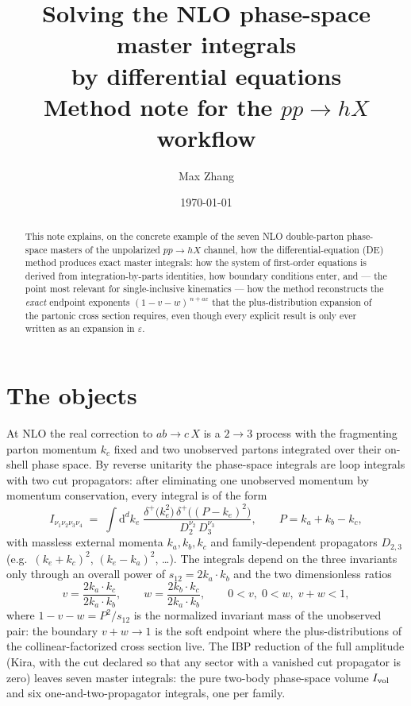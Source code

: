 \documentclass[11pt]{article}
\title{Solving the NLO phase-space master integrals\\
by differential equations\\[1ex]
\large Method note for the $pp \to h X$ workflow}
\author{Max Zhang}
\date{\today}
\newcommand{\eps}{\varepsilon}
\newcommand{\dd}{\mathrm{d}}
\begin{document}
\maketitle

\begin{abstract}
This note explains, on the concrete example of the seven NLO
double-parton phase-space masters of the unpolarized $pp \to hX$
channel, how the differential-equation (DE) method produces exact
master integrals: how the system of first-order equations is derived
from integration-by-parts identities, how boundary conditions enter,
and --- the point most relevant for single-inclusive kinematics ---
how the method reconstructs the \emph{exact} endpoint exponents
$(1-v-w)^{\,n+a\eps}$ that the plus-distribution expansion of the
partonic cross section requires, even though every explicit result is
only ever written as an expansion in $\eps$.
\end{abstract}

\section{The objects}
\label{sec:objects}

At NLO the real correction to $ab \to c\,X$ is a $2\to3$ process with
the fragmenting parton momentum $k_c$ fixed and two unobserved
partons integrated over their on-shell phase space.  By reverse
unitarity the phase-space integrals are loop integrals with two cut
propagators: after eliminating one unobserved momentum by momentum
conservation, every integral is of the form
\begin{equation}
  I_{\nu_1\nu_2\nu_3\nu_4}
  \;=\;
  \int \dd^d k_e\;
  \frac{\delta^{+}\!\big(k_e^2\big)\,
        \delta^{+}\!\big((P-k_e)^2\big)}
       {D_2^{\nu_2}\, D_3^{\nu_3}},
  \qquad P = k_a + k_b - k_c ,
  \label{eq:integral}
\end{equation}
with massless external momenta $k_a, k_b, k_c$ and family-dependent
propagators $D_{2,3}$ (e.g.\ $(k_e+k_c)^2$, $(k_e-k_a)^2$, \dots).
The integrals depend on the three invariants only through an overall
power of $s_{12} = 2k_a\!\cdot\!k_b$ and the two dimensionless ratios
\begin{equation}
  v = \frac{2k_a\!\cdot\!k_c}{2k_a\!\cdot\!k_b},
  \qquad
  w = \frac{2k_b\!\cdot\!k_c}{2k_a\!\cdot\!k_b},
  \qquad
  0 < v,\; 0 < w,\; v + w < 1 ,
\end{equation}
where $1 - v - w = P^2/s_{12}$ is the normalized invariant mass of
the unobserved pair: the boundary $v+w \to 1$ is the soft endpoint
where the plus-distributions of the collinear-factorized cross
section live.  The IBP reduction of the full amplitude (Kira, with
the cut declared so that any sector with a vanished cut propagator is
zero) leaves seven master integrals: the pure two-body phase-space
volume $I_{\rm vol}$ and six one-and-two-propagator integrals, one
per family.
\end{document}
